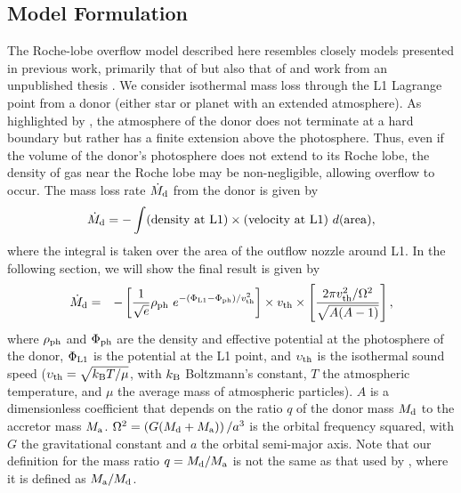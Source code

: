 \documentclass{aastex}
\newcommand{\be}{\begin{eqnarray}}
\newcommand{\ee}{\end{eqnarray}}
\begin{document}
\subsection{Model Formulation}
The Roche-lobe overflow model described here resembles closely models presented in previous work, primarily that of \citet{1988A&A...202...93R} but also that of \citet{1972AcA....22...73P} and work from an unpublished thesis \citep{Jedrzejec1969}. We consider isothermal mass loss through the L1 Lagrange point from a donor (either star or planet with an extended atmosphere). As highlighted by \citet{1988A&A...202...93R}, the atmosphere of the donor does not terminate at a hard boundary but rather has a finite extension above the photosphere. Thus, even if the volume of the donor's photosphere does not extend to its Roche lobe, the density of gas near the Roche lobe may be non-negligible, allowing overflow to occur. The mass loss rate $\dot{M}_{\rm d}$ from the donor is given by
\begin{equation*}
\dot{M}_{\rm d} = -  \int ({\rm density\ at\ L1}) \times ({\rm velocity\ at\ L1}) \ d({\rm area}),
\end{equation*}
where the integral is taken over the area of the outflow nozzle around L1. In the following section, we will show the final result is given by
\be
\dot{M}_{\rm d} & = & - 
\left[ \frac{1}{\sqrt{e}} \rho_{\rm ph}\ e^{-\left( \Phi_{\rm L1}-\Phi_{\rm ph} \right)/v^2_{\rm th} } \right] 
\times v_{\rm th}
\times
\left[ \frac{2\pi v_{\rm th}^2/\Omega^2}{ \sqrt{A(A-1)}} \right],
\label{eq:mdot}
\ee
where $\rho_{\rm ph}$ and $\Phi_{\rm ph}$ are the density and effective potential at the photosphere of the donor, $\Phi_{\rm L1}$ is the potential at the L1 point, and $\upsilon_{\rm th}$ is the isothermal sound speed ($\upsilon_{\rm th} = \sqrt{k_{\rm B} T/\mu}$, with $k_{\rm B}$ Boltzmann's constant, $T$ the atmospheric temperature, and $\mu$ the average mass of atmospheric particles). $A$ is a dimensionless coefficient that depends on the ratio $q$ of the donor mass $M_{\rm d}$ to the accretor mass $M_{\rm a}$. $\Omega^2 = \left( G(M_{\rm d}+M_{\rm a}) \right)/a^3$ is the orbital frequency squared, with $G$ the gravitational constant and $a$ the orbital semi-major axis. Note that our definition for the mass ratio $q = M_{\rm d}/M_{\rm a}$ is not the same as that used by \citet{1988A&A...202...93R}, where it is defined as $M_{\rm a}/M_{\rm d}$.
\end{document}
